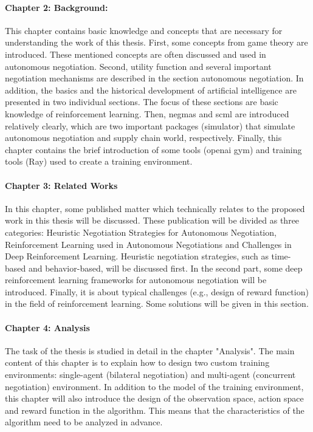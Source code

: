 \paragraph{Chapter 2: Background:}
This chapter contains basic knowledge and concepts that are necessary for understanding the work of this thesis. First, some concepts from game theory are introduced. These mentioned concepts are often discussed and used in autonomous negotiation. Second, utility function and several important negotiation mechanisms are described in the section autonomous negotiation. In addition, the basics and the historical development of artificial intelligence are presented in two individual sections. The focus of these sections are basic knowledge of reinforcement learning. Then, \gls{negmas} and \gls{scml} are introduced relatively clearly, which are two important packages (simulator) that simulate autonomous negotiation and supply chain world, respectively. Finally, this chapter contains the brief introduction of some tools (\gls{openai gym}) and training tools (Ray) used to create a training environment.

\paragraph{Chapter 3: Related Works}
In this chapter, some published matter which technically relates to the proposed work in this thesis will be discussed. These publication will be divided as three categories: Heuristic Negotiation Strategies for Autonomous Negotiation, Reinforcement Learning used in Autonomous Negotiations and Challenges in Deep Reinforcement Learning. Heuristic negotiation strategies, such as time-based and behavior-based, will be discussed first. In the second part, some deep reinforcement learning frameworks for autonomous negotiation will be introduced. Finally, it is about typical challenges (e.g., design of reward function) in the field of reinforcement learning. Some solutions will be given in this section.

\paragraph{Chapter 4: Analysis}
The task of the thesis is studied in detail in the chapter "Analysis". The main content of this chapter is to explain how to design two custom training environments: single-agent (bilateral negotiation) and multi-agent (concurrent negotiation) environment. In addition to the model of the training environment, this chapter will also introduce the design of the observation space, action space and reward function in the algorithm.
This means that the characteristics of the algorithm need to be analyzed in advance.

